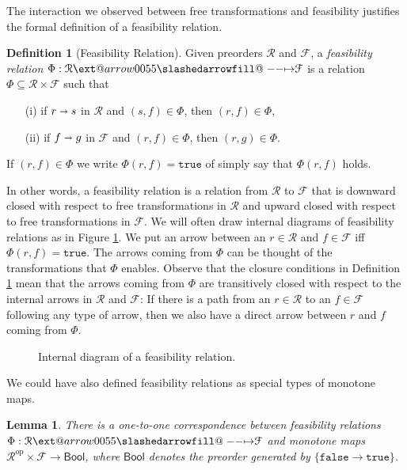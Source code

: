 \documentclass[12pt]{article}
\makeatletter
\theoremstyle{definition}
\newtheorem{definition}{Definition}[section]
\theoremstyle{plain}
\newtheorem{lemma}{Lemma}[section]
\theoremstyle{plain}
\theoremstyle{plain}
\theoremstyle{plain}
\theoremstyle{remark}
\theoremstyle{remark}
\newcommand{\mc}[1]{\mathcal{#1}}
\newcommand{\sub}{\subseteq}
\newcommand{\true}{\mathtt{true}}
\newcommand{\false}{\mathtt{false}}
\def\slashedarrowfill@#1#2#3#4#5{%
	$\m@th\thickmuskip0mu\medmuskip\thickmuskip\thinmuskip\thickmuskip
	\relax#5#1\mkern-7mu%
	\cleaders\hbox{$#5\mkern-2mu#2\mkern-2mu$}\hfill
	\mathclap{#3}\mathclap{#2}%
	\cleaders\hbox{$#5\mkern-2mu#2\mkern-2mu$}\hfill
	\mkern-7mu#4$%
}
\def\rightslashedarrowfill@{%
	\slashedarrowfill@\relbar\relbar\mapstochar\rightarrow}
\newcommand\xslashedrightarrow[2][]{%
	\ext@arrow 0055{\rightslashedarrowfill@}{#1}{#2}}
\makeatother
\begin{document}
The interaction we observed between free transformations and feasibility justifies the formal definition of a feasibility relation.

\begin{definition}[Feasibility Relation]\label{def:feasibility}
	Given preorders $\mc{R}$ and $\mc{F}$, a \emph{feasibility relation} $\Phi: \mc{R} \xslashedrightarrow{} \mc{F}$ is a relation $\Phi \sub \mc{R} \times \mc{F}$ such that
	\begin{itemize}
		\item[(i)] if $r \shortrightarrow s$ in $\mc{R}$ and $(s,f) \in \Phi$, then $(r,f) \in \Phi$,
		\item[(ii)] if $f \shortrightarrow g$ in $\mc{F}$ and $(r,f) \in \Phi$, then $(r,g) \in \Phi$.
	\end{itemize}
	If $(r,f) \in \Phi$ we write $\Phi(r,f) = \true$ of simply say that $\Phi(r,f)$ holds.
\end{definition}

In other words, a feasibility relation is a relation from $\mc{R}$ to $\mc{F}$ that is downward closed with respect to free transformations in $\mc{R}$ and upward closed with respect to free transformations in $\mc{F}$. We will often draw internal diagrams of feasibility relations as in Figure \ref{fig:internal feas}. We put an arrow between an $r \in \mc{R}$ and $f \in \mc{F}$ iff $\Phi(r,f) = \true$. The arrows coming from $\Phi$ can be thought of the transformations that $\Phi$ enables. Observe that the closure conditions in Definition \ref{def:feasibility} mean that the arrows coming from $\Phi$ are transitively closed with respect to the internal arrows in $\mc{R}$ and $\mc{F}$: If there is a path from an $r \in \mc{R}$ to an $f \in \mc{F}$ following any type of arrow, then we also have a direct arrow between $r$ and $f$ coming from $\Phi$.

\begin{figure}\label{fig:internal feas}
	\caption{Internal diagram of a feasibility relation.}
\end{figure}

We could have also defined feasibility relations as special types of monotone maps.

\begin{lemma}
	There is a one-to-one correspondence between feasibility relations $\Phi: \mc{R} \xslashedrightarrow{} \mc{F}$ and monotone maps $\mc{R}^\text{op} \times \mc{F} \rightarrow \mathsf{Bool}$, where $\mathsf{Bool}$ denotes the preorder generated by $\{\false \rightarrow \true\}$. 
\end{lemma}
\end{document}
